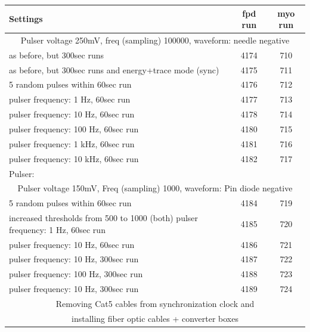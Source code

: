   \begin{table}
  \centering
  	\begin{tabularx}{0.9 \textwidth}{|X|cc|}
  	\hline
  		\bf{Settings} & \bf{fpd run} & \bf{myo run}\\	
  		\hline
  		\multicolumn{3}{|c|}{Pulser voltage 250mV, freq (sampling) 100000, waveform: needle negative}\\
  		\hline
		as before, but 300sec runs & 4174 & 710 \\
		as before, but 300sec runs and energy+trace mode (sync) & 4175 & 711 \\
		5 random pulses within 60sec run & 4176 & 712 \\
		pulser frequency: 1 Hz, 60sec run & 4177 & 713 \\
		pulser frequency: 10 Hz, 60sec run & 4178 & 714 \\
		pulser frequency: 100 Hz, 60sec run & 4180 & 715 \\
		pulser frequency: 1 kHz, 60sec run & 4181 & 716 \\
		pulser frequency: 10 kHz, 60sec run & 4182 & 717 \\
		Pulser:&&\\
		\hline
		\multicolumn{3}{|c|}{Pulser voltage 150mV, Freq (sampling) 1000, waveform: Pin diode negative}\\
		\hline
		5 random pulses within 60sec run & 4184 & 719 \\
		increased thresholds from 500 to 1000 (both)
		pulser frequency: 1 Hz, 60sec run & 4185 & 720 \\
		pulser frequency: 10 Hz, 60sec run & 4186 & 721 \\
		pulser frequency: 10 Hz, 300sec run & 4187 & 722 \\
		pulser frequency: 100 Hz, 300sec run & 4188 & 723 \\
		pulser frequency: 10 Hz, 300sec run & 4189 & 724 \\
		\hline
		\multicolumn{3}{|c|}{ Removing Cat5 cables from synchronization clock and }\\
		\multicolumn{3}{|c|}{ installing fiber optic cables + converter boxes}\\
		

\end{tabularx}
\end{table}
